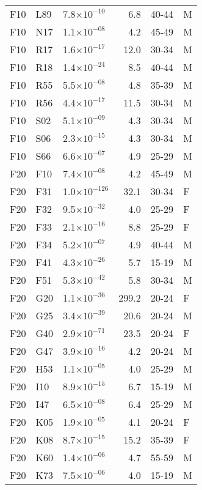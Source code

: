 \begin{longtable}{lllrll}
   F10 & L89 & 7.8$\times10^{-10}$ & 6.8 & 40-44 & M \\ 
   F10 & N17 & 1.1$\times10^{-08}$ & 4.2 & 45-49 & M \\ 
   F10 & R17 & 1.6$\times10^{-17}$ & 12.0 & 30-34 & M \\ 
   F10 & R18 & 1.4$\times10^{-24}$ & 8.5 & 40-44 & M \\ 
   F10 & R55 & 5.5$\times10^{-08}$ & 4.8 & 35-39 & M \\ 
   F10 & R56 & 4.4$\times10^{-17}$ & 11.5 & 30-34 & M \\ 
   F10 & S02 & 5.1$\times10^{-09}$ & 4.3 & 30-34 & M \\ 
   F10 & S06 & 2.3$\times10^{-15}$ & 4.3 & 30-34 & M \\ 
   F10 & S66 & 6.6$\times10^{-07}$ & 4.9 & 25-29 & M \\ 
   F20 & F10 & 7.4$\times10^{-08}$ & 4.2 & 45-49 & M \\ 
   F20 & F31 & 1.0$\times10^{-126}$ & 32.1 & 30-34 & F \\ 
   F20 & F32 & 9.5$\times10^{-32}$ & 4.0 & 25-29 & F \\ 
   F20 & F33 & 2.1$\times10^{-16}$ & 8.8 & 25-29 & F \\ 
   F20 & F34 & 5.2$\times10^{-07}$ & 4.9 & 40-44 & M \\ 
   F20 & F41 & 4.3$\times10^{-26}$ & 5.7 & 15-19 & M \\ 
   F20 & F51 & 5.3$\times10^{-42}$ & 5.8 & 30-34 & M \\ 
   F20 & G20 & 1.1$\times10^{-36}$ & 299.2 & 20-24 & F \\ 
   F20 & G25 & 3.4$\times10^{-39}$ & 20.6 & 20-24 & M \\ 
   F20 & G40 & 2.9$\times10^{-71}$ & 23.5 & 20-24 & F \\ 
   F20 & G47 & 3.9$\times10^{-16}$ & 4.2 & 20-24 & M \\ 
   F20 & H53 & 1.1$\times10^{-05}$ & 4.0 & 25-29 & M \\ 
   F20 & I10 & 8.9$\times10^{-15}$ & 6.7 & 15-19 & M \\ 
   F20 & I47 & 6.5$\times10^{-08}$ & 6.4 & 25-29 & M \\ 
   F20 & K05 & 1.9$\times10^{-05}$ & 4.1 & 20-24 & F \\ 
   F20 & K08 & 8.7$\times10^{-15}$ & 15.2 & 35-39 & F \\ 
   F20 & K60 & 1.4$\times10^{-06}$ & 4.7 & 55-59 & M \\ 
   F20 & K73 & 7.5$\times10^{-06}$ & 4.0 & 15-19 & M \\ 

\end{longtable}
